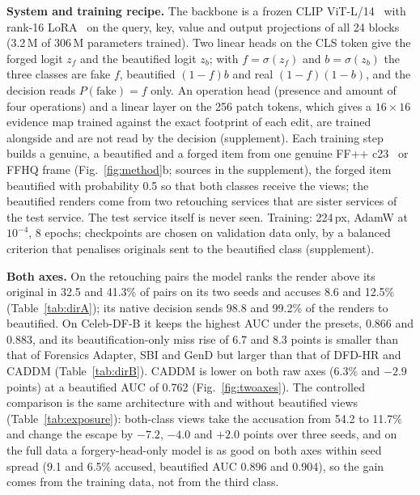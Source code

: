 \documentclass[conference]{IEEEtran}
\begin{document}
\textbf{System and training recipe.} The backbone is a frozen CLIP ViT-L/14~\cite{clip} with rank-16 LoRA~\cite{lora} on the
query, key, value and output projections of all 24 blocks (3.2\,M of 306\,M parameters trained). Two linear heads on the CLS
token give the forged logit $z_f$ and the beautified logit $z_b$; with $f=\sigma(z_f)$ and $b=\sigma(z_b)$ the three classes
are fake $f$, beautified $(1-f)b$ and real $(1-f)(1-b)$, and the decision reads $P(\text{fake})=f$ only. An operation head
(presence and amount of four operations) and a linear layer on the 256 patch tokens, which gives a $16\times16$ evidence map
trained against the exact footprint of each edit, are trained alongside and are not read by the decision (supplement).
Each training step builds a genuine, a beautified and a forged item from one genuine FF++ c23~\cite{ffpp} or FFHQ frame
(Fig.~\ref{fig:method}b; sources in the supplement), the forged item beautified with probability 0.5 so that both classes
receive the views; the beautified renders come from two retouching services that are sister services of the test service.
The test service itself is never seen. Training: 224\,px, AdamW at $10^{-4}$, 8 epochs; checkpoints are chosen on validation
data only, by a balanced criterion that penalises originals sent to the beautified class (supplement).


\textbf{Both axes.} On the retouching pairs the model ranks the render above its original in 32.5 and 41.3\% of pairs on
its two seeds and accuses 8.6 and 12.5\% (Table~\ref{tab:dirA}); its native decision sends 98.8 and 99.2\% of the renders to
beautified. On Celeb-DF-B it keeps the highest AUC under the presets, 0.866 and 0.883, and its beautification-only miss rise
of 6.7 and 8.3 points is smaller than that of Forensics Adapter, SBI and GenD but larger than that of DFD-HR and CADDM
(Table~\ref{tab:dirB}). CADDM is lower on both raw axes (6.3\% and $-2.9$ points) at a beautified AUC of 0.762
(Fig.~\ref{fig:twoaxes}).
The controlled comparison is the same architecture with and without
beautified views (Table~\ref{tab:exposure}): both-class views take the accusation from 54.2 to 11.7\% and change the escape by
$-7.2$, $-4.0$ and $+2.0$ points over three seeds, and on the full data a forgery-head-only model is as good on both axes
within seed spread (9.1 and 6.5\% accused, beautified AUC 0.896 and 0.904), so the gain comes from the training data, not
from the third class.
\end{document}
